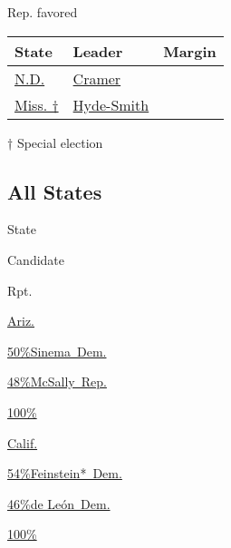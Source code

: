 Rep. favored

\begin{longtable}[]{@{}lll@{}}
\toprule
State & Leader & Margin\tabularnewline
\midrule
\endhead
\href{https://www.nytimes3xbfgragh.onion/elections/results/north-dakota-senate}{N.D.}
&
\href{https://www.nytimes3xbfgragh.onion/elections/results/north-dakota-senate}{Cramer}
&
\href{https://www.nytimes3xbfgragh.onion/elections/results/north-dakota-senate}{}\tabularnewline
\href{https://www.nytimes3xbfgragh.onion/interactive/2018/11/27/us/elections/results-mississippi-senate-runoff-special-election.html}{Miss.
†} &
\href{https://www.nytimes3xbfgragh.onion/interactive/2018/11/27/us/elections/results-mississippi-senate-runoff-special-election.html}{Hyde-Smith}
&
\href{https://www.nytimes3xbfgragh.onion/interactive/2018/11/27/us/elections/results-mississippi-senate-runoff-special-election.html}{}\tabularnewline
\bottomrule
\end{longtable}

† Special election

\hypertarget{all-states}{%
\subsection{All States}\label{all-states}}

State

Candidate

Rpt.

\href{https://www.nytimes3xbfgragh.onion/elections/results/arizona-senate}{Ariz.}

\href{https://www.nytimes3xbfgragh.onion/elections/results/arizona-senate}{
50\%Sinema~Dem.}

\href{https://www.nytimes3xbfgragh.onion/elections/results/arizona-senate}{
48\%McSally~Rep.}

\href{https://www.nytimes3xbfgragh.onion/elections/results/arizona-senate}{100\%}

\href{https://www.nytimes3xbfgragh.onion/elections/results/arizona-senate}{}

\href{https://www.nytimes3xbfgragh.onion/elections/results/california-senate}{Calif.}

\href{https://www.nytimes3xbfgragh.onion/elections/results/california-senate}{
54\%Feinstein*~Dem.}

\href{https://www.nytimes3xbfgragh.onion/elections/results/california-senate}{
46\%de León~Dem.}

\href{https://www.nytimes3xbfgragh.onion/elections/results/california-senate}{100\%}

